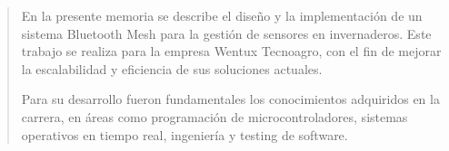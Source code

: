 \documentclass[
    11pt,
    spanish,
    singlespacing,
    parskip,
    headsepline,
    bookmarks=true,
    unicode=true,
    pdftoolbar=true,
    pdfmenubar=true,
    pdffitwindow=false,
    colorlinks=true,
    linkcolor=blue,
    citecolor=blue,
    urlcolor=blue
]{MastersDoctoralThesis}
\begin{document}



\frontmatter %
\pagestyle{plain} %


\begin{abstract}
\addchaptertocentry{\abstractname} %
En la presente memoria se describe el diseño y la implementación de un sistema Bluetooth Mesh para la gestión de sensores en invernaderos. Este trabajo se realiza para la empresa Wentux Tecnoagro, con el fin de mejorar la escalabilidad y eficiencia de sus soluciones actuales.

Para su desarrollo fueron fundamentales los conocimientos adquiridos en la carrera, en áreas como programación de microcontroladores, sistemas operativos en tiempo real, ingeniería y testing de software.							
\end{abstract}


\tableofcontents
\listoffigures
\listoftables


\mainmatter %
\pagestyle{thesis} %








\appendix

%


\renewcommand{\bibname}{Bibliografía} %

\printbibliography[heading=bibintoc]
\end{document}
